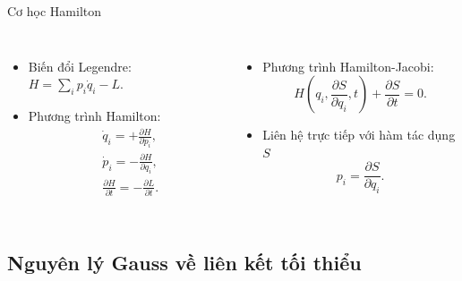 \begin{frame}{Cơ học Hamilton}

\begin{columns}
    \begin{itemize}
        \item Biến đổi Legendre: \( H = \sum_{i} p_i \dot{q}_i - L \).
        \item Phương trình Hamilton:
        \vspace{-2mm}
        \begin{align}
            & \dot{q}_i = +\frac{\partial H}{\partial p_i}, \\
            & \dot{p}_i = -\frac{\partial H}{\partial q_i}, \\
            & \frac{\partial H}{\partial t} = - \frac{\partial L}{\partial t}.
        \end{align}
    \end{itemize}
    \begin{itemize}
        \item Phương trình Hamilton-Jacobi:
        \vspace{-2mm}
        \begin{equation}
            H \left( q_i, \frac{\partial S}{\partial q_i}, t \right) + \frac{\partial S}{\partial t} = 0.
        \end{equation}
        \item Liên hệ trực tiếp với hàm tác dụng \(S\)
        \begin{equation}
            p_i = \frac{\partial S}{\partial q_i}.
        \end{equation}
    \end{itemize}
\end{columns}
\end{frame}

\subsection{Nguyên lý Gauss về liên kết tối thiểu}


